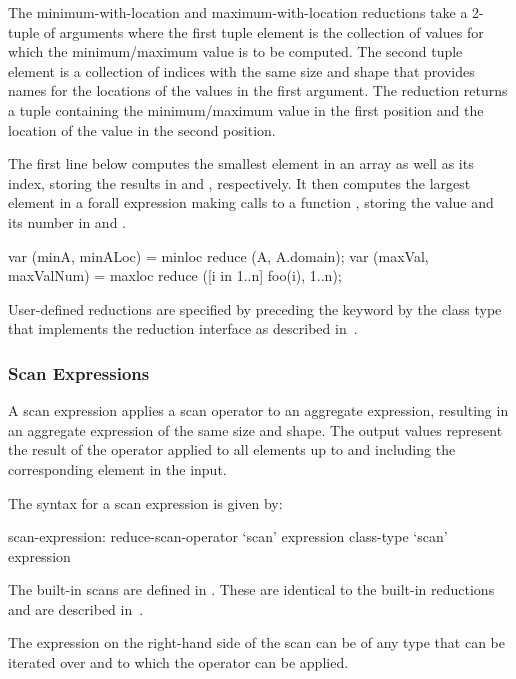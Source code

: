 The minimum-with-location and maximum-with-location reductions take a
2-tuple of arguments where the first tuple element is the collection
of values for which the minimum/maximum value is to be computed.  The
second tuple element is a collection of indices with the same size and
shape that provides names for the locations of the values in the first
argument.  The reduction returns a tuple containing the
minimum/maximum value in the first position and the location of the
value in the second position.

\begin{example}
The first line below computes the smallest element in an array
 as well as its index, storing the results in  and
, respectively.  It then computes the largest element in
a forall expression making calls to a function , storing
the value and its number in  and .
\begin{chapel}
var (minA, minALoc) = minloc reduce (A, A.domain); 
var (maxVal, maxValNum) = maxloc reduce ([i in 1..n] foo(i), 1..n);
\end{chapel}
\end{example}

User-defined reductions are specified by preceding the
keyword  by the class type that implements the reduction
interface as described in~.

\subsubsection{Scan Expressions}
\label{scan}

A scan expression applies a scan operator to an aggregate expression,
resulting in an aggregate expression of the same size and shape.  The
output values represent the result of the operator applied to all
elements up to and including the corresponding element in the input.

The syntax for a scan expression is given by:
\begin{syntax}
scan-expression:
  reduce-scan-operator `scan' expression
  class-type `scan' expression
\end{syntax}

The built-in scans are defined in .  These
are identical to the built-in reductions and are described
in~.

The expression on the right-hand side of the scan can be of any type
that can be iterated over and to which the operator can be applied.

